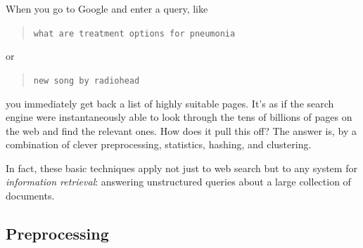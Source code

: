 \documentclass{report}
\theoremstyle{plain}
\theoremstyle{definition}
\begin{document}
When you go to Google and enter a query, like
\begin{quote}
{\tt what are treatment options for pneumonia}
\end{quote}
or
\begin{quote}
{\tt new song by radiohead}
\end{quote}
you immediately get back a list of highly suitable pages. It's as if the search engine
were instantaneously able to look through the tens of billions of pages on the web and
find the relevant ones. How does it pull this off? The answer is, by a combination of
clever preprocessing, statistics, hashing, and clustering.

In fact, these basic techniques apply not just to web search but to any system for
{\it information retrieval}: answering unstructured queries about a large collection
of documents.

\subsection{Preprocessing}
\end{document}
